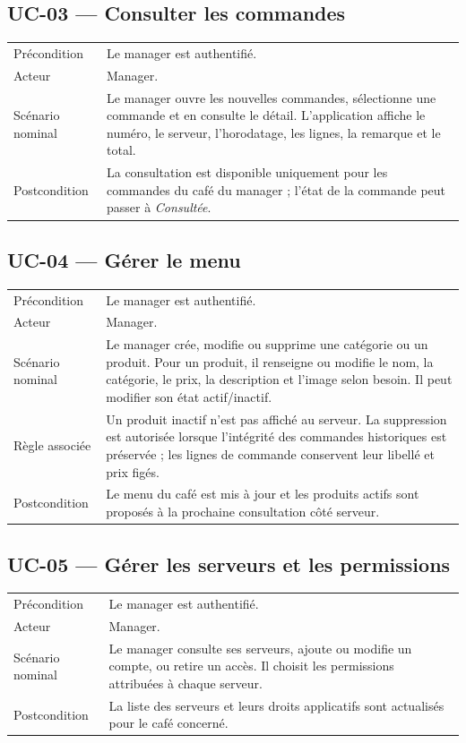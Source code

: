 \documentclass[11pt,a4paper]{article}
\begin{document}
\subsection{UC-03 — Consulter les commandes}
\begin{tabularx}{\textwidth}{P{0.28\textwidth}Y}
\toprule Précondition & Le manager est authentifié. \\
Acteur & Manager. \\
Scénario nominal & Le manager ouvre les nouvelles commandes, sélectionne une commande et en consulte le détail. L’application affiche le numéro, le serveur, l’horodatage, les lignes, la remarque et le total. \\
Postcondition & La consultation est disponible uniquement pour les commandes du café du manager ; l’état de la commande peut passer à \emph{Consultée}. \\
\bottomrule
\end{tabularx}

\subsection{UC-04 — Gérer le menu}
\begin{tabularx}{\textwidth}{P{0.28\textwidth}Y}
\toprule Précondition & Le manager est authentifié. \\
Acteur & Manager. \\
Scénario nominal & Le manager crée, modifie ou supprime une catégorie ou un produit. Pour un produit, il renseigne ou modifie le nom, la catégorie, le prix, la description et l’image selon besoin. Il peut modifier son état actif/inactif. \\
Règle associée & Un produit inactif n’est pas affiché au serveur. La suppression est autorisée lorsque l’intégrité des commandes historiques est préservée ; les lignes de commande conservent leur libellé et prix figés. \\
Postcondition & Le menu du café est mis à jour et les produits actifs sont proposés à la prochaine consultation côté serveur. \\
\bottomrule
\end{tabularx}

\subsection{UC-05 — Gérer les serveurs et les permissions}
\begin{tabularx}{\textwidth}{P{0.28\textwidth}Y}
\toprule Précondition & Le manager est authentifié. \\
Acteur & Manager. \\
Scénario nominal & Le manager consulte ses serveurs, ajoute ou modifie un compte, ou retire un accès. Il choisit les permissions attribuées à chaque serveur. \\
Postcondition & La liste des serveurs et leurs droits applicatifs sont actualisés pour le café concerné. \\
\bottomrule
\end{tabularx}
\end{document}
